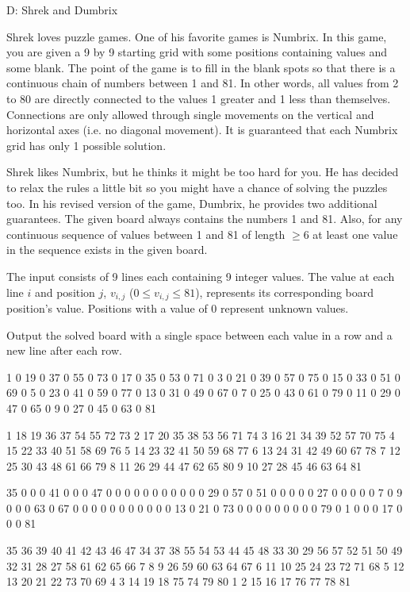 \begin{problem}{D: Shrek and Dumbrix}

Shrek loves puzzle games.
One of his favorite games is Numbrix.
In this game, you are given a 9 by 9 starting grid with some positions containing values and some blank.
The point of the game is to fill in the blank spots so that there is a continuous chain of numbers between 1 and 81.
In other words, all values from 2 to 80 are directly connected to the values 1 greater and 1 less than themselves.
Connections are only allowed through single movements on the vertical and horizontal axes (i.e. no diagonal movement).
It is guaranteed that each Numbrix grid has only 1 possible solution.

Shrek likes Numbrix, but he thinks it might be too hard for you.
He has decided to relax the rules a little bit so you might have a chance of solving the puzzles too.
In his revised version of the game, Dumbrix, he provides two additional guarantees.
The given board always contains the numbers 1 and 81.
Also, for any continuous sequence of values between 1 and 81 of length $\geq 6$ at least one value in the sequence exists in the given board.
\end{problem}

\begin{formalin}
The input consists of 9 lines each containing 9 integer values.
The value at each line $i$ and position $j$, $v_{i,j}$ ($0 \leq v_{i,j} \leq 81$), represents its corresponding board position's value.
Positions with a value of 0 represent unknown values.
\end{formalin}

\begin{formalout}
Output the solved board with a single space between each value in a row and a new line after each row.
\end{formalout}

\begin{datain}
1 0 19 0 37 0 55 0 73
0 17 0 35 0 53 0 71 0
3 0 21 0 39 0 57 0 75
0 15 0 33 0 51 0 69 0
5 0 23 0 41 0 59 0 77
0 13 0 31 0 49 0 67 0
7 0 25 0 43 0 61 0 79
0 11 0 29 0 47 0 65 0
9 0 27 0 45 0 63 0 81
\end{datain}
\begin{dataout}
1 18 19 36 37 54 55 72 73
2 17 20 35 38 53 56 71 74
3 16 21 34 39 52 57 70 75
4 15 22 33 40 51 58 69 76
5 14 23 32 41 50 59 68 77
6 13 24 31 42 49 60 67 78
7 12 25 30 43 48 61 66 79
8 11 26 29 44 47 62 65 80
9 10 27 28 45 46 63 64 81
\end{dataout}

\begin{datain}
35 0 0 0 41 0 0 0 47
0 0 0 0 0 0 0 0 0
0 0 29 0 57 0 51 0 0
0 0 0 27 0 0 0 0 0
7 0 9 0 0 0 63 0 67
0 0 0 0 0 0 0 0 0
0 0 13 0 21 0 73 0 0
0 0 0 0 0 0 0 79 0
1 0 0 0 17 0 0 0 81
\end{datain}
\begin{dataout}
35 36 39 40 41 42 43 46 47
34 37 38 55 54 53 44 45 48
33 30 29 56 57 52 51 50 49
32 31 28 27 58 61 62 65 66
7 8 9 26 59 60 63 64 67
6 11 10 25 24 23 72 71 68
5 12 13 20 21 22 73 70 69
4 3 14 19 18 75 74 79 80
1 2 15 16 17 76 77 78 81
\end{dataout}
